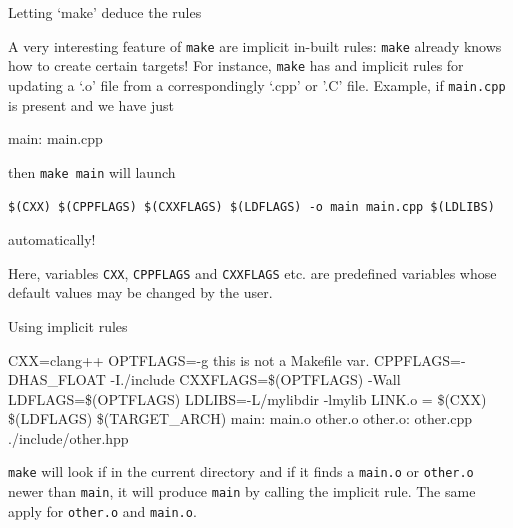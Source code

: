 \documentclass[10pt,aspectratio=169]{beamer}
\newcommand{\blue}{\color{blue}}
\begin{document}
\begin{frame}{Letting `make' deduce the rules} 

A very interesting feature of \texttt{make} are \alert{implicit} in-built rules: \texttt{make} already knows
how to create certain targets!
For instance, \texttt{make} has  and \alert{implicit rules} for
updating a `.o' file from a correspondingly `.cpp'  or '.C' file. Example, if \texttt{main.cpp} is present
and we have just 
\begin{semiverbatim}
	main: main.cpp
\end{semiverbatim}
then \texttt{make main} will launch
\smallskip

{\scriptsize
\texttt{\$(CXX) \$(CPPFLAGS) \$(CXXFLAGS) \$(LDFLAGS) -o main main.cpp \$(LDLIBS)} 
}
\smallskip

automatically!
\smallskip

Here, variables \texttt{CXX}, \texttt{CPPFLAGS} and \texttt{CXXFLAGS} etc. are \alert{predefined variables}
whose default values may be {\blue changed by the user}.
\end{frame}



\begin{frame}{Using implicit rules}
\begin{semiverbatim}
CXX=clang++\newline
OPTFLAGS=-g \alert{this is not a Makefile var.}\newline
CPPFLAGS=-DHAS\_FLOAT -I./include\newline
CXXFLAGS=\$(OPTFLAGS) -Wall\newline
LDFLAGS=\$(OPTFLAGS)\newline
LDLIBS=-L/mylibdir -lmylib\newline
LINK.o = \$(CXX) \$(LDFLAGS) \$(TARGET\_ARCH)\newline
main: main.o other.o\newline
other.o: other.cpp ./include/other.hpp
\end{semiverbatim}
\smallskip

\texttt{make} will look if in the current directory and if it finds
a \texttt{main.o} or \texttt{other.o} newer than \texttt{main}, it will produce \texttt{main} by calling the implicit rule.
The same apply for \texttt{other.o} and \texttt{main.o}.
\end{frame}
\end{document}
